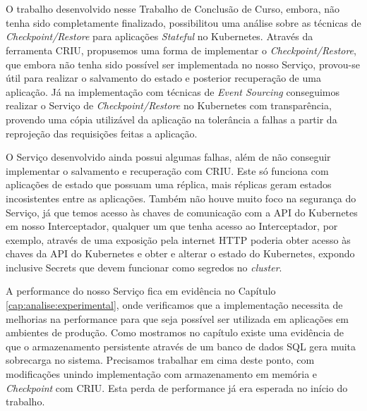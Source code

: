 

\chapter{} \label{cap:conclusion}

	O trabalho desenvolvido nesse Trabalho de Conclusão de Curso, embora, não 
	tenha sido completamente finalizado, possibilitou uma análise sobre as técnicas
	de \textit{Checkpoint/Restore} para aplicações \textit{Stateful} no Kubernetes.
	Através da ferramenta CRIU, propusemos uma forma de implementar o
	\textit{Checkpoint/Restore}, que embora não tenha sido possível ser implementada
	no nosso Serviço, provou-se útil para realizar o salvamento do estado e posterior
	recuperação de uma aplicação. Já na implementação com técnicas de
	\textit{Event Sourcing} conseguimos realizar o Serviço de \textit{Checkpoint/Restore}
	no Kubernetes com transparência, provendo uma cópia utilizável da aplicação na
	tolerância a falhas a partir da reprojeção das requisições feitas a aplicação.
	
	O Serviço desenvolvido ainda possui algumas falhas, além de não conseguir
	implementar	o salvamento e recuperação com CRIU. Este só funciona com aplicações
	de estado que possuam uma réplica, mais réplicas geram estados incosistentes
	entre as aplicações. Também não houve muito foco na segurança do
	Serviço, já que temos acesso às chaves de comunicação com a API do Kubernetes
	em nosso Interceptador, qualquer um que tenha acesso ao Interceptador, por
	exemplo, através de uma exposição pela internet HTTP poderia obter acesso às
	chaves da API do Kubernetes e obter e alterar o estado do Kubernetes, expondo
	inclusive Secrets que devem funcionar como segredos no \textit{cluster}.

	A performance do nosso Serviço fica em evidência no Capítulo \ref{cap:analise:experimental},
	onde verificamos que a implementação necessita de melhorias na performance para
	que seja possível ser utilizada em aplicações em ambientes de produção. Como
	mostramos no capítulo existe uma evidência de que o armazenamento persistente
	através de um banco de dados SQL gera muita sobrecarga no sistema. Precisamos
	trabalhar em cima deste ponto, com modificações unindo implementação com
	armazenamento em memória e \textit{Checkpoint} com CRIU. Esta perda de
	performance já era esperada no início do trabalho.


